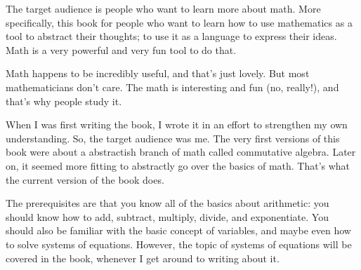 
The target audience is people who want to learn more about math. More
specifically, this book for people who want to learn how to use mathematics as a
tool to abstract their thoughts; to use it as a language to express their
ideas. Math is a very powerful and very fun tool to do that.

Math happens to be incredibly useful, and that's just lovely. But most
mathematicians don't care. The math is interesting and fun (no, really!), and
that's why people study it.

When I was first writing the book, I wrote it in an effort to strengthen
my own understanding. So, the target audience was me. The very first
versions of this book were about a abstractish branch of math called
commutative algebra. Later on, it seemed more fitting to abstractly go
over the basics of math. That's what the current version of the book
does.

The prerequisites are that you know all of the basics about arithmetic: you
should know how to add, subtract, multiply, divide, and exponentiate. You should
also be familiar with the basic concept of variables, and maybe even how to
solve systems of equations. However, the topic of systems of equations will be
covered in the book, whenever I get around to writing about it.
